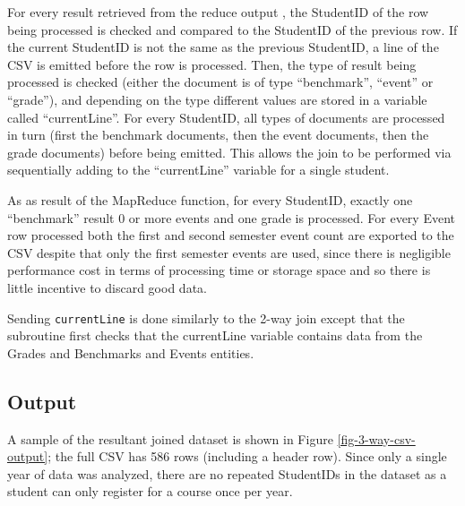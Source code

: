 For every result retrieved from the reduce output , the StudentID of the row being processed is checked and compared to the StudentID of the previous row. If the current StudentID is not the same as the previous StudentID, a line of the CSV is emitted before the row is processed. Then, the type of result being processed is checked (either the document is of type ``benchmark'', ``event'' or ``grade''), and depending on the type different values are stored in a variable called ``currentLine''. For every StudentID, all types of documents are processed in turn (first the benchmark documents, then the event documents, then the grade documents) before being emitted. This allows the join to be performed via sequentially adding to the ``currentLine'' variable for a single student.

As as result of the MapReduce function, for every StudentID, exactly one ``benchmark'' result 0 or more events and one grade is processed. For every Event row processed both the first and second semester event count are exported to the CSV despite that only the first semester events are used, since there is negligible performance cost in terms of processing time or storage space and so there is little incentive to discard good data.

Sending \texttt{currentLine} is done similarly to the 2-way join except that the subroutine first checks that the currentLine variable contains data from the Grades and Benchmarks and Events entities.



\subsection{Output}
A sample of the resultant joined dataset is shown in Figure \ref{fig-3-way-csv-output}; the full CSV has 586 rows (including a header row). Since only a single year of data was analyzed, there are no repeated StudentIDs in the dataset as a student can only register for a course once per year.

